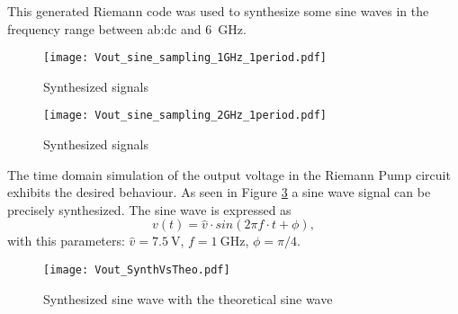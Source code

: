 This generated Riemann code was used to synthesize some sine waves in the frequency range between \gls{ab:dc} and \SI{6}{\GHz}.

\begin{figure}[htb!]
   \centering
   \texttt{[image: Vout\_sine\_sampling\_1GHz\_1period.pdf]}
   \caption{Synthesized signals}
   \label{fig:SynthesizedSignalWithStatedRiemanncode}
\end{figure}


\begin{figure}[htb!]
   \centering
   \texttt{[image: Vout\_sine\_sampling\_2GHz\_1period.pdf]}
   \caption{Synthesized signals}
   \label{fig:SynthesizedSignalWithStatedRiemanncode}
\end{figure}

%
%















The time domain simulation of the output voltage in the Riemann Pump circuit exhibits the desired behaviour. 
As seen in Figure \ref{fig:SineWaveSynthVsTheoretical} a sine wave signal can be precisely synthesized. 
The sine wave is expressed as 
\begin{equation}
	v(t)= \widehat{v} \cdot sin( 2  \pi  f \cdot  t + \phi),
\end{equation}
with this parameters: $\widehat{v} = \SI{7.5}{\volt}$, $f = \SI{1}{\giga \hertz}$, $\phi = \pi / 4$.

\begin{figure}[htb!]
   \centering
   \texttt{[image: Vout\_SynthVsTheo.pdf]}
   \caption{Synthesized sine wave with the theoretical sine wave}
   \label{fig:SineWaveSynthVsTheoretical}
\end{figure}

